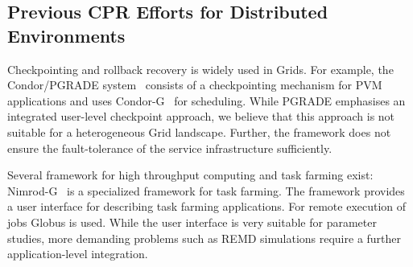 \documentclass[times, 10pt,twocolumn]{article}
\newcommand{\alnote}[1]{ {\textcolor{blue} { ***AL: #1 }}}
\newcommand{\alnote}[1]{}
\begin{document}
%                                                                                  
%                                                 
                                             
     


\subsection*{Previous CPR Efforts for Distributed Environments}

Checkpointing and rollback recovery is widely used in Grids. For
example, the Condor/PGRADE system~\cite{DBLP:conf/eagc/KovacsK04}
consists of a checkpointing mechanism for PVM applications and uses
Condor-G~\cite{citeulike:291860} for scheduling.  While PGRADE
emphasises an integrated user-level checkpoint approach, we believe
that this approach is not suitable for a heterogeneous Grid
landscape. Further, the framework does not ensure the fault-tolerance
of the service infrastructure sufficiently.
                                 
Several framework for high throughput computing and task farming exist:
Nimrod-G~\cite{buyya00nimrodg} is a specialized framework for task
farming. The framework provides a user interface for describing task
farming applications. For remote execution of jobs Globus is
used. While the user interface is very suitable for parameter studies,
more demanding problems such as REMD simulations require a further
application-level integration.
\end{document}
